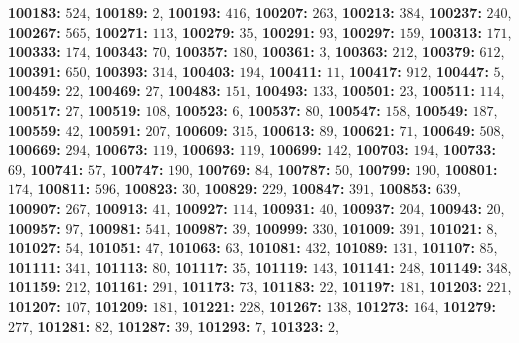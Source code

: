 \textsf{\bfseries 100183:} $524$, \textsf{\bfseries 100189:} $2$, \textsf{\bfseries 100193:} $416$, \textsf{\bfseries 100207:} $263$, \textsf{\bfseries 100213:} $384$, \textsf{\bfseries 100237:} $240$, \textsf{\bfseries 100267:} $565$, \textsf{\bfseries 100271:} $113$, \textsf{\bfseries 100279:} $35$, \textsf{\bfseries 100291:} $93$, \textsf{\bfseries 100297:} $159$, \textsf{\bfseries 100313:} $171$, \textsf{\bfseries 100333:} $174$, \textsf{\bfseries 100343:} $70$, \textsf{\bfseries 100357:} $180$, \textsf{\bfseries 100361:} $3$, \textsf{\bfseries 100363:} $212$, 
\textsf{\bfseries 100379:} $612$, \textsf{\bfseries 100391:} $650$, \textsf{\bfseries 100393:} $314$, \textsf{\bfseries 100403:} $194$, \textsf{\bfseries 100411:} $11$, \textsf{\bfseries 100417:} $912$, \textsf{\bfseries 100447:} $5$, \textsf{\bfseries 100459:} $22$, \textsf{\bfseries 100469:} $27$, \textsf{\bfseries 100483:} $151$, \textsf{\bfseries 100493:} $133$, \textsf{\bfseries 100501:} $23$, \textsf{\bfseries 100511:} $114$, \textsf{\bfseries 100517:} $27$, \textsf{\bfseries 100519:} $108$, \textsf{\bfseries 100523:} $6$, \textsf{\bfseries 100537:} $80$, \textsf{\bfseries 100547:} $158$, \textsf{\bfseries 100549:} $187$, \textsf{\bfseries 100559:} $42$, \textsf{\bfseries 100591:} $207$, \textsf{\bfseries 100609:} $315$, \textsf{\bfseries 100613:} $89$, \textsf{\bfseries 100621:} $71$, \textsf{\bfseries 100649:} $508$, \textsf{\bfseries 100669:} $294$, \textsf{\bfseries 100673:} $119$, \textsf{\bfseries 100693:} $119$, \textsf{\bfseries 100699:} $142$, \textsf{\bfseries 100703:} $194$, \textsf{\bfseries 100733:} $69$, \textsf{\bfseries 100741:} $57$, \textsf{\bfseries 100747:} $190$, \textsf{\bfseries 100769:} $84$, \textsf{\bfseries 100787:} $50$, \textsf{\bfseries 100799:} $190$, \textsf{\bfseries 100801:} $174$, \textsf{\bfseries 100811:} $596$, \textsf{\bfseries 100823:} $30$, \textsf{\bfseries 100829:} $229$, \textsf{\bfseries 100847:} $391$, \textsf{\bfseries 100853:} $639$, \textsf{\bfseries 100907:} $267$, \textsf{\bfseries 100913:} $41$, \textsf{\bfseries 100927:} $114$, \textsf{\bfseries 100931:} $40$, \textsf{\bfseries 100937:} $204$, \textsf{\bfseries 100943:} $20$, \textsf{\bfseries 100957:} $97$, \textsf{\bfseries 100981:} $541$, \textsf{\bfseries 100987:} $39$, \textsf{\bfseries 100999:} $330$, \textsf{\bfseries 101009:} $391$, \textsf{\bfseries 101021:} $8$, \textsf{\bfseries 101027:} $54$, \textsf{\bfseries 101051:} $47$, \textsf{\bfseries 101063:} $63$, \textsf{\bfseries 101081:} $432$, \textsf{\bfseries 101089:} $131$, \textsf{\bfseries 101107:} $85$, \textsf{\bfseries 101111:} $341$, \textsf{\bfseries 101113:} $80$, \textsf{\bfseries 101117:} $35$, \textsf{\bfseries 101119:} $143$, \textsf{\bfseries 101141:} $248$, \textsf{\bfseries 101149:} $348$, \textsf{\bfseries 101159:} $212$, \textsf{\bfseries 101161:} $291$, \textsf{\bfseries 101173:} $73$, \textsf{\bfseries 101183:} $22$, \textsf{\bfseries 101197:} $181$, \textsf{\bfseries 101203:} $221$, \textsf{\bfseries 101207:} $107$, \textsf{\bfseries 101209:} $181$, \textsf{\bfseries 101221:} $228$, \textsf{\bfseries 101267:} $138$, \textsf{\bfseries 101273:} $164$, \textsf{\bfseries 101279:} $277$, \textsf{\bfseries 101281:} $82$, \textsf{\bfseries 101287:} $39$, \textsf{\bfseries 101293:} $7$, \textsf{\bfseries 101323:} $2$, 